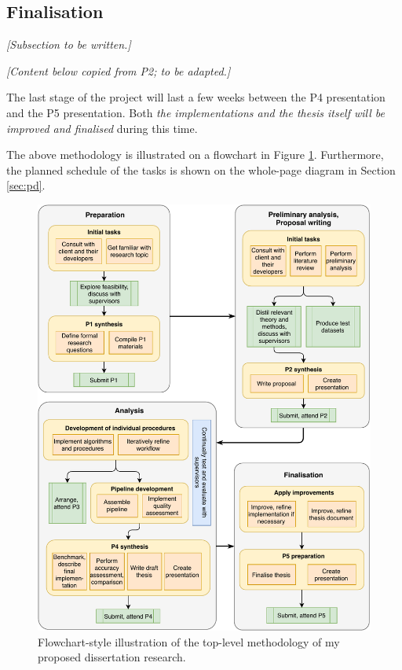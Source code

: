 \subsection{Finalisation}
\label{sub:finalisation}

\textit{[Subsection to be written.]}

\textit{[Content below copied from P2; to be adapted.]}

The last stage of the project will last a few weeks between the P4 presentation and the P5 presentation. Both \textit{the implementations and the thesis itself will be improved and finalised} during this time.

The above methodology is illustrated on a flowchart in Figure \ref{fig:methodflow}. Furthermore, the planned schedule of the tasks is shown on the whole-page diagram in Section \ref{sec:pd}.

\begin{figure}[]
    \centering
    \includegraphics[width=0.9\linewidth]{p2/figs/methodology.pdf}
    \caption{Flowchart-style illustration of the top-level methodology of my proposed dissertation research.}
    \label{fig:methodflow}
\end{figure}

